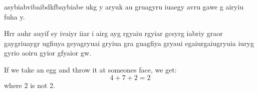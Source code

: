 \pagebreak

\begin{WrapCurvedR}
asybiabvibaibdkfbaybiabe ukg y aryuk au gruagyru iuaegy avru gawe g airyiu fuha y.	
\end{WrapCurvedR}

Hrr auhr auyif sy ivaiyr iiar i airg ayg rgyaiu rgyiar gcsyrg iabriy graor gaygriuaygr ugfiuya geyagryuai gryiua gra guagfiya gryaui egaiurgaiugryuia iuryg gyrio aoiru gyior gfyaior gw.


\begin{pres_exmpl}
	If we take an egg and throw it at someones face, we get:
	$$
	4+7+2=2
	$$
	where 2 is not 2.
\end{pres_exmpl}
